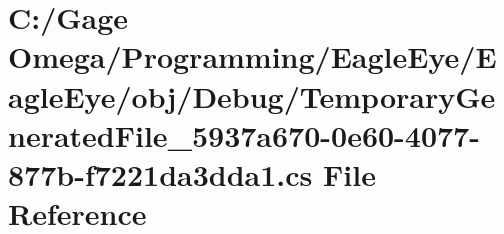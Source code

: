 \hypertarget{_debug_2_temporary_generated_file__5937a670-0e60-4077-877b-f7221da3dda1_8cs}{}\section{C\+:/\+Gage Omega/\+Programming/\+Eagle\+Eye/\+Eagle\+Eye/obj/\+Debug/\+Temporary\+Generated\+File\+\_\+5937a670-\/0e60-\/4077-\/877b-\/f7221da3dda1.cs File Reference}
\label{_debug_2_temporary_generated_file__5937a670-0e60-4077-877b-f7221da3dda1_8cs}
